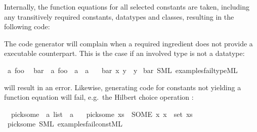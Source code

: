 \begin{isabellebody}
\begin{isamarkuptext}
  Internally, the function equations for all selected
  constants are taken, including any transitively required
  constants, datatypes and classes, resulting in the following
  code:


  The code generator will complain when a required
  ingredient does not provide a executable counterpart.
  This is the case if an involved type is not a datatype:%
\end{isamarkuptext}%
\isamarkuptrue%
%
\isadelimML
%
\endisadelimML
%
\isatagML
%
\endisatagML
{\isafoldML}%
%
\isadelimML
\isanewline
%
\endisadelimML
{}\isamarkupfalse%
\ {\isacharprime}a\ foo\isanewline
\isanewline
{}\isamarkupfalse%
\isanewline
\ \ bar\ {\isacharcolon}{\isacharcolon}\ {\isachardoublequoteopen}{\isacharprime}a\ foo\ {\isasymRightarrow}\ {\isacharprime}a\ {\isasymRightarrow}\ {\isacharprime}a{\isachardoublequoteclose}\ \isanewline
\ \ {\isachardoublequoteopen}bar\ x\ y\ {\isacharequal}\ y{\isachardoublequoteclose}\isanewline
%
\isadelimML
%
\endisadelimML
%
\isatagML
%
\endisatagML
{\isafoldML}%
%
\isadelimML
%
\endisadelimML
\isanewline
{}\isamarkupfalse%
\ bar\ {\isacharparenleft}SML\ {\isachardoublequoteopen}examples{\isacharslash}fail{\isacharunderscore}type{\isachardot}ML{\isachardoublequoteclose}{\isacharparenright}%
\begin{isamarkuptext}%
\noindent will result in an error. Likewise, generating code
  for constants not yielding
  a function equation will fail, e.g.~the Hilbert choice
  operation :%
\end{isamarkuptext}%
\isamarkuptrue%
%
\isadelimML
%
\endisadelimML
%
\isatagML
%
\endisatagML
{\isafoldML}%
%
\isadelimML
\isanewline
%
\endisadelimML
{}\isamarkupfalse%
\isanewline
\ \ pick{\isacharunderscore}some\ {\isacharcolon}{\isacharcolon}\ {\isachardoublequoteopen}{\isacharprime}a\ list\ {\isasymRightarrow}\ {\isacharprime}a{\isachardoublequoteclose}\ \isanewline
\ \ {\isachardoublequoteopen}pick{\isacharunderscore}some\ xs\ {\isacharequal}\ {\isacharparenleft}SOME\ x{\isachardot}\ x\ {\isasymin}\ set\ xs{\isacharparenright}{\isachardoublequoteclose}\isanewline
%
\isadelimML
%
\endisadelimML
%
\isatagML
%
\endisatagML
{\isafoldML}%
%
\isadelimML
%
\endisadelimML
\isanewline
{}\isamarkupfalse%
\ pick{\isacharunderscore}some\ {\isacharparenleft}SML\ {\isachardoublequoteopen}examples{\isacharslash}fail{\isacharunderscore}const{\isachardot}ML{\isachardoublequoteclose}{\isacharparenright}%

\end{isabellebody}

